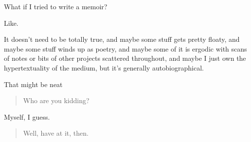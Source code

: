 What if I tried to write a memoir?

Like.

It doesn't need to be totally true, and maybe some stuff gets pretty floaty, and maybe some stuff winds up as poetry, and maybe some of it is ergodic with scans of notes or bits of other projects scattered throughout, and maybe I just own the hypertextuality of the medium, but it's generally autobiographical.

That might be neat

\begin{quote}
Who are you kidding?
\end{quote}

Myself, I guess.

\begin{quote}
Well, have at it, then.
\end{quote}
